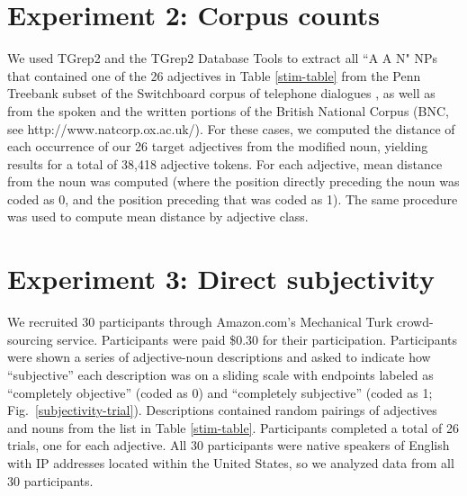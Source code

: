 \documentclass{pnastwo}
\newcommand{\tableref}[1]{Table \ref{#1}}
\newcommand{\figref}[1]{~\ref{#1}}
\begin{document}
\begin{article}
\begin{materials}
\section{Experiment 2: Corpus counts} 
We used TGrep2 \cite{rohde2005} and the TGrep2 Database Tools \cite{degenjaeger-tdt} to extract all ``A A N"  NPs that contained one of the 26 adjectives in Table \ref{stim-table} from the Penn Treebank subset of the Switchboard corpus of telephone dialogues \cite{godfrey1992}, as well as from the spoken and the written portions of the British National Corpus (BNC, see http://www.natcorp.ox.ac.uk/). For these cases, we computed the distance of each occurrence of our 26 target adjectives from the modified noun, yielding results for a total of 38,418 adjective tokens.  For each adjective, mean distance from the noun was computed (where the position directly preceding the noun was coded as 0, and the position preceding that was coded as 1). The same procedure was used to compute mean distance by adjective class.

\section{Experiment 3: Direct subjectivity}
We recruited 30 participants through Amazon.com's Mechanical Turk crowd-sourcing service. Participants were paid \$0.30 for their participation. Participants were shown a series of adjective-noun descriptions and asked to indicate how ``subjective'' each description was on a sliding scale with endpoints labeled as ``completely objective'' (coded as 0) and ``completely subjective'' (coded as 1; Fig.~\ref{subjectivity-trial}). Descriptions contained random pairings of adjectives and nouns from the list in Table \ref{stim-table}. Participants completed a total of 26 trials, one for each adjective. All 30 participants were native speakers of English with IP addresses located within the United States, so we analyzed data from all 30 participants.


\end{materials}
\end{article}
\end{document}
